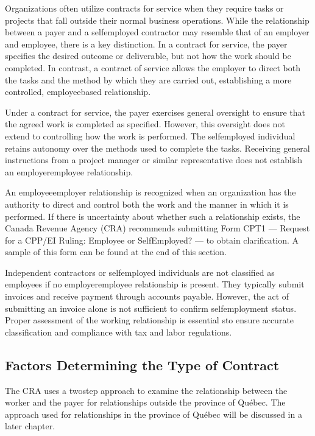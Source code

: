 \documentclass[letterpaper,10pt,english]{sphinxmanual}
\begin{document}
\sphinxAtStartPar
Organizations often utilize contracts for service when they require tasks or projects that fall outside their normal business
operations. While the relationship between a payer and a self\sphinxhyphen{}employed contractor may resemble that of an employer and
employee, there is a key distinction. In a contract for service, the payer specifies the desired outcome or deliverable, but
not how the work should be completed. In contrast, a contract of service allows the employer to direct both the tasks and the
method by which they are carried out, establishing a more controlled, employee\sphinxhyphen{}based relationship.

\sphinxAtStartPar
Under a contract for service, the payer exercises general oversight to ensure that the agreed work is completed as specified.
However, this oversight does not extend to controlling how the work is performed. The self\sphinxhyphen{}employed individual retains
autonomy over the methods used to complete the tasks. Receiving general instructions from a project manager or similar
representative does not establish an employer\sphinxhyphen{}employee relationship.

\sphinxAtStartPar
An employee\sphinxhyphen{}employer relationship is recognized when an organization has the authority to direct and control both the work and
the manner in which it is performed. If there is uncertainty about whether such a relationship exists, the Canada Revenue
Agency (CRA) recommends submitting Form CPT1 — Request for a CPP/EI Ruling: Employee or Self\sphinxhyphen{}Employed? — to obtain
clarification. A sample of this form can be found at the end of this section.

\sphinxAtStartPar
Independent contractors or self\sphinxhyphen{}employed individuals are not classified as employees if no employer\sphinxhyphen{}employee relationship is
present. They typically submit invoices and receive payment through accounts payable. However, the act of submitting an
invoice alone is not sufficient to confirm self\sphinxhyphen{}employment status. Proper assessment of the working relationship is essential
sto ensure accurate classification and compliance with tax and labor regulations.


\subsection{Factors Determining the Type of Contract}
\label{\detokenize{compliance:factors-determining-the-type-of-contract}}
\sphinxAtStartPar
The CRA uses a two\sphinxhyphen{}step approach to examine the relationship between the worker and the
payer for relationships outside the province of Québec. The approach used for relationships
in the province of Québec will be discussed in a later chapter.
\end{document}
